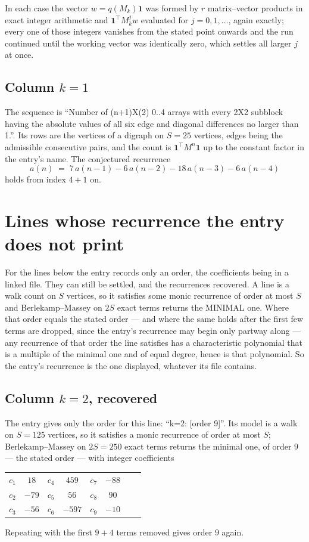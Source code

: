 \documentclass[11pt,a4paper]{article}
\theoremstyle{plain}
\theoremstyle{definition}
\begin{document}
In each case the vector $w=q(M_k)\mathbf{1}$ was formed by $r$ matrix--vector products in
exact integer arithmetic and $\mathbf{1}^{\!\top}M_k^{j}w$ evaluated for $j=0,1,\dots$,
again exactly; every one of those integers vanishes from the stated point onwards and the run
continued until the working vector was identically zero, which settles all larger $j$ at once.

\subsection*{Column $k$$=1$}
The sequence is ``Number of (n+1)X(2) 0..4 arrays with every 2X2 subblock having the absolute values of all six edge and diagonal differences no larger than 1.''. Its rows are the vertices of a digraph on
$S=25$ vertices, edges being the admissible consecutive pairs, and the count is
$\mathbf{1}^{\!\top}M^{n}\mathbf{1}$ up to the constant factor in the entry's name.
The conjectured recurrence
\[
a(n)\;=\;7\,a(n-1) - 6\,a(n-2) - 18\,a(n-3) - 6\,a(n-4)
\]
holds from index $4+1$ on.


\section{Lines whose recurrence the entry does not print}

For the lines below the entry records only an order, the coefficients being in a linked file.
They can still be settled, and the recurrences recovered. A line is a walk count on $S$
vertices, so it satisfies some monic recurrence of order at most $S$ and Berlekamp--Massey on
$2S$ exact terms returns the MINIMAL one. Where that order equals the stated order --- and
where the same holds after the first few terms are dropped, since the entry's recurrence may
begin only partway along --- any recurrence of that order the line satisfies has a
characteristic polynomial that is a multiple of the minimal one and of equal degree, hence is
that polynomial. So the entry's recurrence is the one displayed, whatever its file contains.

\subsection*{Column $k=2$, recovered}
The entry gives only the order for this line: ``k=2: [order 9]''. Its model is a walk on
$S=125$ vertices, so it satisfies a monic recurrence of order at most $S$;
Berlekamp--Massey on $2S=250$ exact terms returns the minimal one, of order
$9$ --- the stated order --- with integer coefficients
\begin{center}\small\begin{tabular}{cccccccc}
$c_{1}$ & $18$ & $c_{4}$ & $459$ & $c_{7}$ & $-88$ &  &  \\
$c_{2}$ & $-79$ & $c_{5}$ & $56$ & $c_{8}$ & $90$ &  &  \\
$c_{3}$ & $-56$ & $c_{6}$ & $-597$ & $c_{9}$ & $-10$ &  &  \\
\end{tabular}\end{center}
Repeating with the first $9+4$ terms removed gives order $9$ again.
\end{document}
